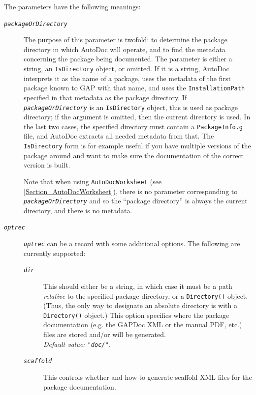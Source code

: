\documentclass[a4paper,11pt]{report}
\begin{document}
{{{ The parameters have the following meanings: 
\begin{description}
\item[{\mbox{\texttt{\mdseries\slshape packageOrDirectory}}}]  The purpose of this parameter is twofold: to determine the package directory
in which \textsf{AutoDoc} will operate, and to find the metadata concerning the package being
documented. The parameter is either a string, an \texttt{IsDirectory} object, or omitted. If it is a string, \textsf{AutoDoc} interprets it as the name of a package, uses the metadata of the first package
known to \textsf{GAP} with that name, and uses the \texttt{InstallationPath} specified in that metadata as the package directory. If \mbox{\texttt{\mdseries\slshape packageOrDirectory}} is an \texttt{IsDirectory} object, this is used as package directory; if the argument is omitted, then
the current directory is used. In the last two cases, the specified directory
must contain a \texttt{PackageInfo.g} file, and \textsf{AutoDoc} extracts all needed metadata from that. The \texttt{IsDirectory} form is for example useful if you have multiple versions of the package around
and want to make sure the documentation of the correct version is built. 

 Note that when using \texttt{AutoDocWorksheet} (see \ref{Section_AutoDocWorksheet}), there is no parameter corresponding to \mbox{\texttt{\mdseries\slshape packageOrDirectory}} and so the ``package directory'' is always the current directory, and there is no metadata. 
\item[{\mbox{\texttt{\mdseries\slshape optrec}}}]  \mbox{\texttt{\mdseries\slshape optrec}} can be a record with some additional options. The following are currently
supported: 
\begin{description}
\item[{\mbox{\texttt{\mdseries\slshape dir}}}]  This should either be a string, in which case it must be a path \emph{relative} to the specified package directory, or a \texttt{Directory()} object. (Thus, the only way to designate an absolute directory is with a \texttt{Directory()} object.) This option specifies where the package documentation (e.g. the \textsf{GAPDoc} XML or the manual PDF, etc.) files are stored and/or will be generated. \\
 \emph{Default value: \texttt{"doc/"}.} 
\item[{\mbox{\texttt{\mdseries\slshape scaffold}}}]  This controls whether and how to generate scaffold XML files for the package
documentation. 


\end{description}
\end{description}}}}
\end{document}
